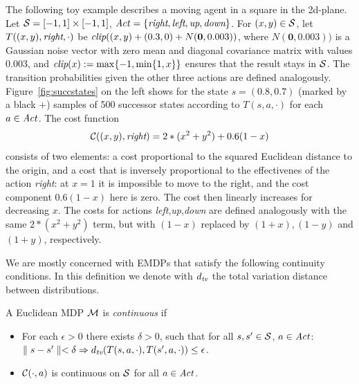\documentclass{llncs}
\begin{document}
\begin{example}
\label{ex:2dex}
The following toy example describes a moving agent in a square in the 2d-plane.
Let $\mathcal{S}=[-1,1]\times [-1,1]$, $\mathit{Act}=\{\emph{right},\emph{left},\emph{up},\emph{down}\}$. For
$(x,y)\in \mathcal{S}$, let $T((x,y),\emph{right},\cdot)$ be
$\emph{clip}((x,y)+(0.3,0)+N({\boldsymbol 0},0.003))$, where $N({\boldsymbol 0},0.003))$ is a Gaussian noise
vector with zero mean and diagonal covariance matrix with values 0.003, and
$\emph{clip}(x):=\max\{-1,\min\{1,x\}\}$  ensures that the result stays in $\mathcal{S}$.
The transition probabilities given the other three actions are defined analogously.
Figure~\ref{fig:succstates} on the left shows for the state $s=(0.8,0.7)$ (marked by a black $+$)
samples of 500 successor states according
to $T(s,a,\cdot)$ for each $a\in\mathit{Act}$.
The cost function 
\begin{equation}
\label{eq:2dcosts}
\mathcal{C}((x,y),\emph{right})= 2*(x^2+y^2)+0.6(1-x)
\end{equation}
consists of two elements: a cost proportional to the squared Euclidean distance to the origin, and a cost
that is inversely proportional to the effectivenes of the action \emph{right}: at $x=1$ it is impossible to move
to the right, and the cost component $0.6(1-x)$ here is zero. The cost then linearly increases 
for decreasing $x$. The costs for actions
\emph{left},\emph{up},\emph{down} are defined analogously with the same $ 2*(x^2+y^2)$ term, but with
$(1-x)$ replaced by $(1+x),(1-y)$ and $(1+y)$, respectively.
\end{example}

We are mostly concerned with EMDPs that satisfy the following continuity conditions. In this
definition we denote with $d_{\emph{tv}}$ the total variation distance between distributions.
\begin{definition}
   \label{def:continuous}
   A Euclidean MDP $\mathcal{M}$ is \emph{continuous} if
   \begin{itemize}
   \item For each $\epsilon>0$ there exists $\delta>0$, such that for all  $s,s'\in\mathcal{S}$, $a\in\mathit{Act}$:
    $\parallel s-s'\parallel < \delta \Rightarrow d_{\emph{tv}}(T(s,a,\cdot),T(s',a,\cdot))\leq \epsilon$.
     \item $\mathcal{C}(\cdot,a)$ is continuous on $\mathcal{S}$ for all $a\in\mathit{Act}$.
   \end{itemize}
 \end{definition}
\end{document}
